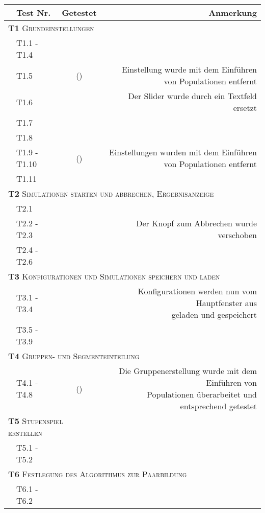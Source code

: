 \documentclass[parskip=full,11pt,openany]{scrreprt}
\newcommand{\cmark}{\ding{51}}%
\newcommand{\xmark}{\ding{55}}%
\begin{document}
\begin{table}[h]
	\centering
	\begin{tabular}{@{}ll|c|r@{}}
		\toprule
		&\textbf{Test Nr.} & \textbf{Getestet} &\textbf{Anmerkung} \\ 
		\midrule
		\multicolumn{3}{l|}{\small \textsc{\textbf{T1} Grundeinstellungen}} \\ 
		&T1.1 - T1.4 & \cmark & \\
		&T1.5 & (\xmark) & \makecell{Einstellung wurde mit dem Einführen\\ von Populationen entfernt}\\
		&T1.6 & \cmark & Der Slider wurde durch ein Textfeld ersetzt\\
		&T1.7 & \cmark & \\
		&T1.8 & \cmark & \\
		&T1.9 - T1.10 & (\xmark) & \makecell{Einstellungen wurden mit dem Einführen\\ von Populationen entfernt}\\
		&T1.11 & \cmark & \\ 
		\multicolumn{4}{l}{\small \textsc{\textbf{T2} Simulationen starten und abbrechen, Ergebnisanzeige}}\\ 
		&T2.1 & \cmark & \\
		&T2.2 - T2.3 & \cmark & Der Knopf zum Abbrechen wurde verschoben\\
		&T2.4 - T2.6 & \cmark & \\
		\multicolumn{4}{l}{\small \textsc{\textbf{T3} Konfigurationen und Simulationen speichern und laden}}\\ 	
		&T3.1 - T3.4 & \cmark & \makecell{Konfigurationen werden nun vom Hauptfenster aus\\ geladen und gespeichert}\\
		&T3.5 - T3.9 & \cmark & \\
		\multicolumn{4}{l}{\small \textsc{\textbf{T4} Gruppen- und Segmenteinteilung}}\\ 
		&T4.1 - T4.8 & (\cmark) & \makecell{Die Gruppenerstellung wurde mit dem Einführen von\\ Populationen überarbeitet und entsprechend getestet} \\
		\multicolumn{3}{l|}{\small \textsc{\textbf{T5} Stufenspiel erstellen}}\\ 
		&T5.1 - T5.2 & \cmark & \\
		\multicolumn{4}{l}{\small \textsc{\textbf{T6} Festlegung des Algorithmus zur Paarbildung}}\\ 
		&T6.1 - T6.2 & \cmark & \\

\end{tabular}
\end{table}
\end{document}
